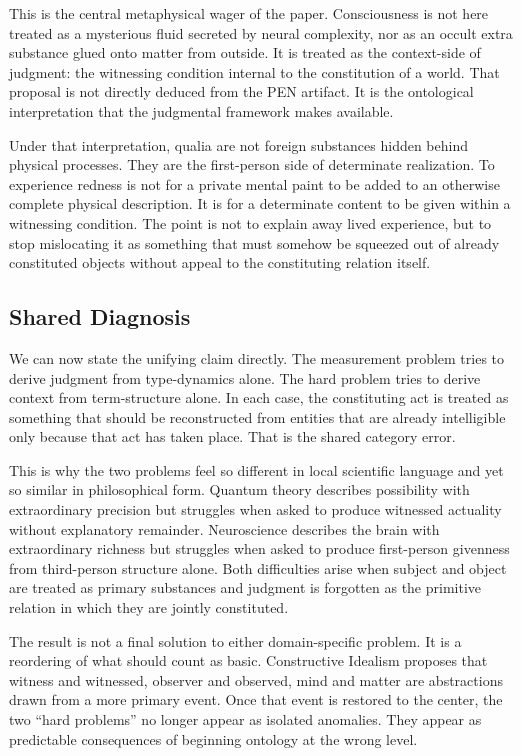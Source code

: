 \documentclass[11pt,a4paper]{article}
\theoremstyle{plain}
\theoremstyle{definition}
\theoremstyle{remark}
\begin{document}
This is the central metaphysical wager of the paper.
Consciousness is not here treated as a mysterious fluid secreted by neural complexity, nor as an occult extra substance glued onto matter from outside.
It is treated as the context-side of judgment: the witnessing condition internal to the constitution of a world.
That proposal is not directly deduced from the PEN artifact.
It is the ontological interpretation that the judgmental framework makes available.

Under that interpretation, qualia are not foreign substances hidden behind physical processes.
They are the first-person side of determinate realization.
To experience redness is not for a private mental paint to be added to an otherwise complete physical description.
It is for a determinate content to be given within a witnessing condition.
The point is not to explain away lived experience, but to stop mislocating it as something that must somehow be squeezed out of already constituted objects without appeal to the constituting relation itself.

\subsection{Shared Diagnosis}
\label{subsec:shared-diagnosis}

We can now state the unifying claim directly.
The measurement problem tries to derive judgment from type-dynamics alone.
The hard problem tries to derive context from term-structure alone.
In each case, the constituting act is treated as something that should be reconstructed from entities that are already intelligible only because that act has taken place.
That is the shared category error.

This is why the two problems feel so different in local scientific language and yet so similar in philosophical form.
Quantum theory describes possibility with extraordinary precision but struggles when asked to produce witnessed actuality without explanatory remainder.
Neuroscience describes the brain with extraordinary richness but struggles when asked to produce first-person givenness from third-person structure alone.
Both difficulties arise when subject and object are treated as primary substances and judgment is forgotten as the primitive relation in which they are jointly constituted.

The result is not a final solution to either domain-specific problem.
It is a reordering of what should count as basic.
Constructive Idealism proposes that witness and witnessed, observer and observed, mind and matter are abstractions drawn from a more primary event.
Once that event is restored to the center, the two ``hard problems'' no longer appear as isolated anomalies.
They appear as predictable consequences of beginning ontology at the wrong level.
\end{document}
